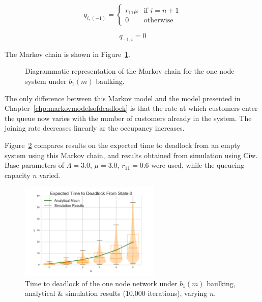 \documentclass{article}
\begin{document}
\begin{equation}\label{eqn:1nssBb1}
  q_{i, (-1)} = \left\{
  \begin{array}{rr}
    r_{11}\mu & \text{if } i = n + 1 \\
    0 & \text{otherwise}
  \end{array}
  \right.
\end{equation}

\begin{equation}\label{eqn:1nssCb1}
  q_{-1, i} = 0
\end{equation}

The Markov chain is shown in Figure~\ref{fig:1nodeMCbaulking1}.

\begin{figure}[!hbtp]
  \begin{center}
    
  \end{center}
  \caption{Diagrammatic representation of the Markov chain for the one node system under $b_1(m)$ baulking.}
  \label{fig:1nodeMCbaulking1}
\end{figure}

The only difference between this Markov model and the model presented in Chapter~\ref{chp:markovmodelsofdeadlock} is that the rate at which customers enter the queue now varies with the number of customers already in the system.
The joining rate decreases linearly ar the occupancy increases.

Figure~\ref{fig:b1_varyn_sim} compares results on the expected time to deadlock from an empty system using this Markov chain, and results obtained from simulation using Ciw.
Base parameters of $\Lambda = 3.0$, $\mu = 3.0$, $r_{11} = 0.6$ were used, while the queueing capacity $n$ varied.

\begin{figure}[!hbtp]
    \begin{center}
        \includegraphics[width=0.6\textwidth]{img/baulking1_varyn.pdf}
    \end{center}
    \caption{Time to deadlock of the one node network under $b_1(m)$ baulking, analytical \& simulation results (10,000 iterations), varying $n$.}
    \label{fig:b1_varyn_sim}
\end{figure}
\end{document}
